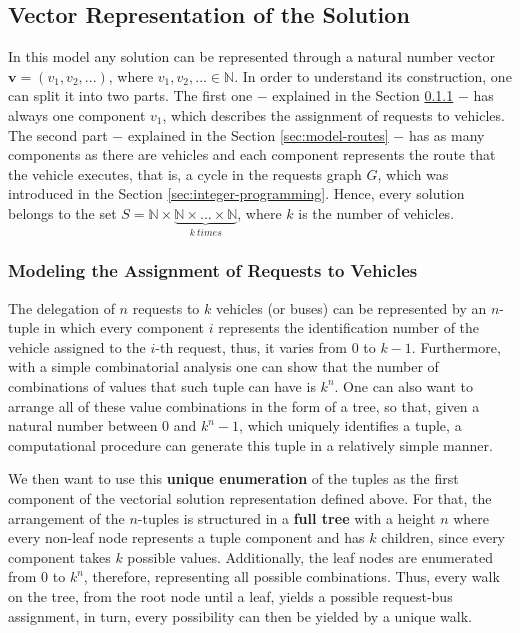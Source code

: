 \documentclass[tuberlin,cic,tc,openright,english,noabntcite,oneside]{iiufrgs}
\begin{document}
\subsection{Vector Representation of the Solution}
In this model any solution can be represented through a natural number vector $\mathbf{v} = (v_1, v_2,...)$, where $v_1,v_2,... \in \mathbb{N}$. In order to understand its construction, one can split it into two parts. The first one $-$ explained in the Section \ref{sec:model-request-bus} $-$ has always one component $v_1$, which describes the assignment of requests to vehicles. The second part $-$ explained in the Section \ref{sec:model-routes} $-$ has as many components as there are vehicles and each component represents the route that the vehicle executes, that is, a cycle in the requests graph $G$, which was introduced in the Section \ref{sec:integer-programming}. Hence, every solution belongs to the set $S = \mathbb{N} \times \underbrace{\mathbb{N} \times \dots \times \mathbb{N}}_{k~times}$, where $k$ is the number of vehicles.

\subsubsection{Modeling the Assignment of Requests to Vehicles}\label{sec:model-request-bus}
The delegation of $n$ requests to $k$ vehicles (or buses) can be represented by an $n$-tuple in which every component $i$ represents the identification number of the vehicle assigned to the $i$-th request, thus, it varies from $0$ to $k-1$. Furthermore, with a simple combinatorial analysis one can show that the number of combinations of values that such tuple can have is $k^n$. One can also want to arrange all of these value combinations in the form of a tree, so that, given a natural number between $0$ and $k^n-1$, which uniquely identifies a tuple, a computational procedure can generate this tuple in a relatively simple manner.

We then want to use this \textbf{unique enumeration} of the tuples as the first component of the vectorial solution representation defined above. For that, the arrangement of the $n$-tuples is structured in a \textbf{full tree} with a height $n$ where every non-leaf node represents a tuple component and has $k$ children, since every component takes $k$ possible values. Additionally, the leaf nodes are enumerated from $0$ to $k^{n}$, therefore, representing all possible combinations. Thus, every walk on the tree, from the root node until a leaf, yields a possible request-bus assignment, in turn, every possibility can then be yielded by a unique walk.
\end{document}
